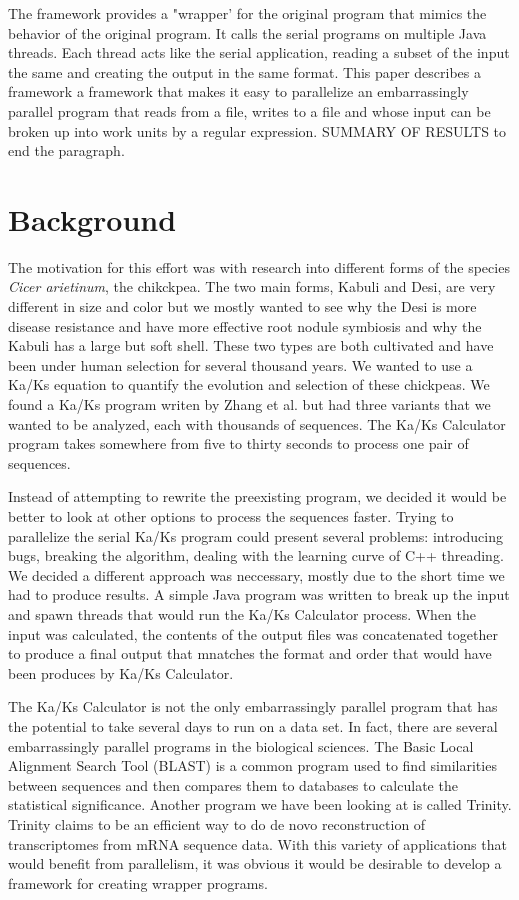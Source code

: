 \documentclass[12pt]{article}
\begin{document}
The framework provides a "wrapper' for the original program that mimics the
behavior of the original program. It calls the serial programs on multiple Java 
threads. Each thread acts like the serial application, reading a subset of the 
input the same and creating the output in the same format. This paper describes
a framework a framework that makes it easy to parallelize an embarrassingly
parallel program that reads from a file, writes to a file and whose input can be
broken up into work units by a regular expression. 
SUMMARY OF RESULTS to end the paragraph.

\section{Background}

The motivation for this effort was with research into different forms of the 
species \emph{Cicer arietinum}, the chikckpea. The two main forms, Kabuli and 
Desi, are very different in size and color but we mostly wanted to see why the 
Desi is more disease resistance and have more effective root nodule symbiosis 
and why the Kabuli has a large but soft shell. These two types are both 
cultivated and have been under human selection for several thousand years. We 
wanted to use a Ka/Ks equation to quantify the evolution and selection of these 
chickpeas. We found a Ka/Ks program writen by Zhang et al. \cite{kaks} but had 
three variants that we wanted to be analyzed, each with thousands of sequences. 
The Ka/Ks Calculator program takes somewhere from five to thirty seconds to 
process one pair of sequences. 

Instead of attempting to rewrite the preexisting program, we decided it would be
better to look at other options to process the sequences faster. Trying to 
parallelize the serial Ka/Ks program could present several problems: introducing
bugs, breaking the algorithm, dealing with the learning curve of C++ threading. 
We decided a  different approach was neccessary, mostly due to the short time we
had to produce results. A simple Java program was written to break up the input 
and spawn  threads that would run the Ka/Ks Calculator process. When the input 
was calculated, the contents of the output files was concatenated together to 
produce a final output that mnatches the format and order that would have been
produces by Ka/Ks Calculator.

The Ka/Ks Calculator is not the only embarrassingly parallel program that has the
potential to take several days to run on a data set. In fact, there are several
embarrassingly parallel programs in the biological sciences. The Basic Local
Alignment Search Tool (BLAST) \cite{BLAST} is a common program used to find
similarities between sequences and then compares them to databases to calculate
the statistical significance. Another program we have been looking at is called
Trinity. Trinity claims to be an efficient way to do de novo reconstruction of
transcriptomes from mRNA sequence data. With this variety of applications that 
would benefit from parallelism, it was obvious it would be desirable to develop
a framework for creating wrapper programs.
\end{document}
